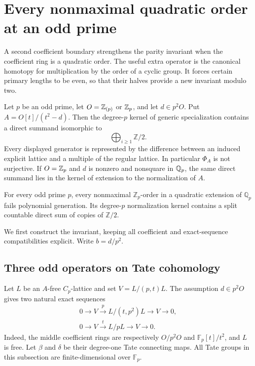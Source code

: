 \section{Every nonmaximal quadratic order at an odd prime}
\label{sec:odd-quadratic-orders}

A second coefficient boundary strengthens the parity invariant when the
coefficient ring is a quadratic order.  The useful extra operator is the
canonical homotopy for multiplication by the order of a cyclic group.
It forces certain primary lengths to be even, so that their halves
provide a new invariant modulo two.

\begin{theorem}\label{thm:odd-quadratic-orders}
Let $p$ be an odd prime, let $O=\mathbb Z_{(p)}$ or $\mathbb Z_p$, and let $d\in p^2O$.
Put $A=O[t]/(t^2-d)$.  Then the degree-$p$ kernel of generic
specialization contains a direct summand isomorphic to
\[
 \bigoplus_{i\ge1}\mathbb Z/2.
\]
Every displayed generator is represented by the difference between an
induced explicit lattice and a multiple of the regular lattice.
In particular $\Phi_A$ is not surjective.
If $O=\mathbb Z_p$ and $d$ is nonzero and nonsquare in $\mathbb Q_p$, the same direct
summand lies in the kernel of extension to the normalization of $A$.
\end{theorem}

\begin{corollary}\label{cor:odd-quadratic-orders}
For every odd prime $p$, every nonmaximal $\mathbb Z_p$-order in a
quadratic extension of $\mathbb Q_p$ fails polynomial generation.
Its degree-$p$ normalization kernel contains a split countable direct
sum of copies of $\mathbb Z/2$.
\end{corollary}

We first construct the invariant, keeping all coefficient and
exact-sequence compatibilities explicit.  Write $b=d/p^2$.

\subsection{Three odd operators on Tate cohomology}

Let $L$ be an $A$-free $C_p$-lattice and set $V=L/(p,t)L$.
The assumption $d\in p^2O$ gives two natural exact sequences
\begin{align}
 0\longrightarrow V\xrightarrow{p}L/(t,p^2)L
       \longrightarrow V\longrightarrow0,\label{eq:order-beta-seq}\\
 0\longrightarrow V\xrightarrow{t}L/pL
       \longrightarrow V\longrightarrow0.\label{eq:order-delta-seq}
\end{align}
Indeed, the middle coefficient rings are respectively
$O/p^2O$ and $\mathbb F_p[t]/t^2$, and $L$ is free.
Let $\beta$ and $\delta$ be their degree-one Tate connecting maps.
All Tate groups in this subsection are finite-dimensional over
$\mathbb F_p$.


